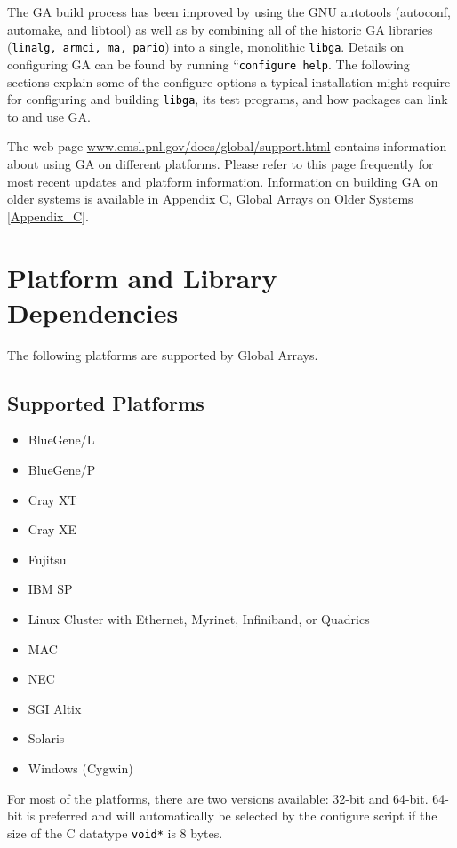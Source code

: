 The GA build process has been improved by using the GNU autotools
(autoconf, automake, and libtool) as well as by combining all of the
historic GA libraries (\texttt{\textcolor{black}{linalg, armci, ma,
pario}}) into a single, monolithic \texttt{\textcolor{black}{libga}}.
Details on configuring GA can be found by running \textquotedblleft{}\texttt{\textcolor{black}{configure
\textendash{}help}}\textquotedbl{}. The following sections explain
some of the configure options a typical installation might require
for configuring and building \texttt{\textcolor{black}{libga}}, its
test programs, and how packages can link to and use GA. 

The web page \url{www.emsl.pnl.gov/docs/global/support.html} contains
information about using GA on different platforms. Please refer to
this page frequently for most recent updates and platform information.
Information on building GA on older systems is available in Appendix
C, Global Arrays on Older Systems \ref{Appendix_C}.


\section{Platform and Library Dependencies }

The following platforms are supported by Global Arrays. 


\subsection{Supported Platforms}
\begin{itemize}
\item BlueGene/L 
\item BlueGene/P 
\item Cray XT 
\item Cray XE 
\item Fujitsu 
\item IBM SP
\item Linux Cluster with Ethernet, Myrinet, Infiniband, or Quadrics
\item MAC
\item NEC 
\item SGI Altix
\item Solaris
\item Windows (Cygwin) 
\end{itemize}
For most of the platforms, there are two versions available: 32-bit
and 64-bit. 64-bit is preferred and will automatically be selected
by the configure script if the size of the C datatype \texttt{\textcolor{black}{void{*}}}
is 8 bytes. 


